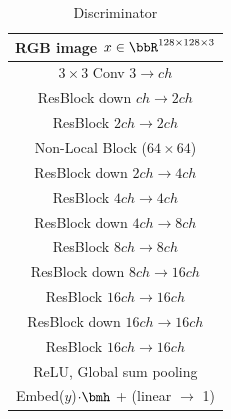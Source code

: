\begin{table}[ht]
\begin{subtable}{.4\textwidth}
              \centering
              {\begin{tabular}{c}
                  \toprule
                  \midrule
                  RGB image $x\in \bbR^{128 \times 128 \times 3}$ \\
                  \midrule
                  $3\times 3$ Conv $3\rightarrow ch$\\
                  \midrule
                  ResBlock down $ch \rightarrow 2ch$\\
                  \midrule
                  ResBlock $2ch \rightarrow 2ch$\\
                  \midrule
                  Non-Local Block ($64\times 64$) \\
                  \midrule
                  ResBlock down $2ch \rightarrow 4ch$\\
                  \midrule
                  ResBlock $4ch \rightarrow 4ch$\\
                  \midrule
                  ResBlock down $4ch \rightarrow 8ch$\\
                  \midrule
                  ResBlock $8ch \rightarrow 8ch$\\
                  \midrule
                  ResBlock down $8ch \rightarrow 16ch$\\
                  \midrule
                  ResBlock $16ch \rightarrow 16ch$\\
                  \midrule
                  ResBlock down $16ch \rightarrow 16ch$\\
                  \midrule
                  ResBlock $16ch \rightarrow 16ch$\\
                  \midrule
                  ReLU, Global sum pooling\\
                  \midrule
                  Embed($y$)$\cdot \bmh$ + (linear $\rightarrow$ 1) \\
                  \midrule
                  \bottomrule
              \end{tabular}}
              \caption{\label{tab:deep_dis_resnet_imagenet_128} Discriminator}
          \end{subtable}
\end{table}

